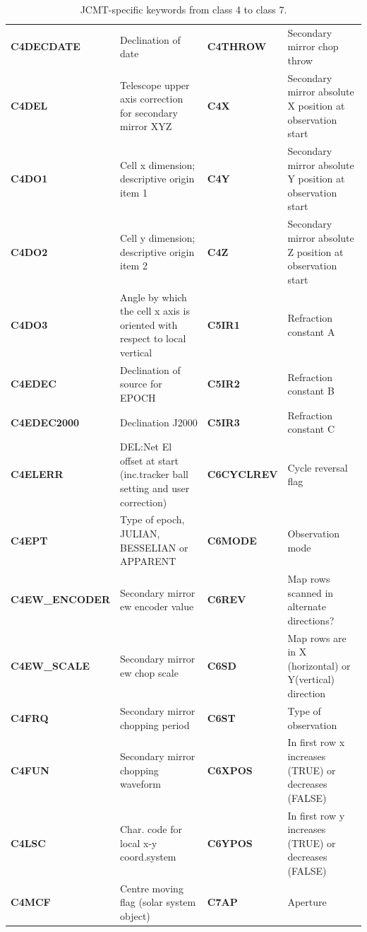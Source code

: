 \documentclass[final,authoryear,5p,times,twocolumn]{elsarticle}
\begin{document}
\begin{table}[!ht]
\caption{JCMT-specific keywords from class 4 to class 7.}
\label{tab:appa2}
\begin{center}
\begin{tabular}{|lp{2.0in}|lp{2.0in}|}
\hline
\textbf{C4DECDATE} & Declination of date & \textbf{C4THROW} & Secondary mirror chop throw\\
\textbf{C4DEL} & Telescope upper axis correction for secondary mirror XYZ & \textbf{C4X} & Secondary mirror absolute X position at observation start\\
\textbf{C4DO1} & Cell x dimension; descriptive origin item 1 & \textbf{C4Y} & Secondary mirror absolute Y position at observation start\\
\textbf{C4DO2} & Cell y dimension; descriptive origin item 2 & \textbf{C4Z} & Secondary mirror absolute Z position at observation start\\
\textbf{C4DO3} & Angle by which the cell x axis is oriented with respect to local vertical & \textbf{C5IR1} & Refraction constant A\\
\textbf{C4EDEC} & Declination of source for EPOCH & \textbf{C5IR2} & Refraction constant B\\
\textbf{C4EDEC2000} & Declination J2000 & \textbf{C5IR3} & Refraction constant C\\
\textbf{C4ELERR} & DEL:Net El offset at start (inc.tracker ball setting and user correction) & \textbf{C6CYCLREV} & Cycle reversal flag\\
\textbf{C4EPT} & Type of epoch, JULIAN, BESSELIAN or APPARENT & \textbf{C6MODE} & Observation mode\\
\textbf{C4EW\_ENCODER} & Secondary mirror ew encoder value & \textbf{C6REV} & Map rows scanned in alternate directions?\\
\textbf{C4EW\_SCALE} & Secondary mirror ew chop scale & \textbf{C6SD} & Map rows are in X (horizontal) or Y(vertical) direction\\
\textbf{C4FRQ} & Secondary mirror chopping period & \textbf{C6ST} & Type of observation\\
\textbf{C4FUN} & Secondary mirror chopping waveform & \textbf{C6XPOS} & In first row x increases (TRUE) or decreases (FALSE)\\
\textbf{C4LSC} & Char. code for local x-y coord.system & \textbf{C6YPOS} & In first row y increases (TRUE) or decreases (FALSE)\\
\textbf{C4MCF} & Centre moving flag (solar system object) & \textbf{C7AP} & Aperture\\

\end{tabular}
\end{center}
\end{table}
\end{document}
